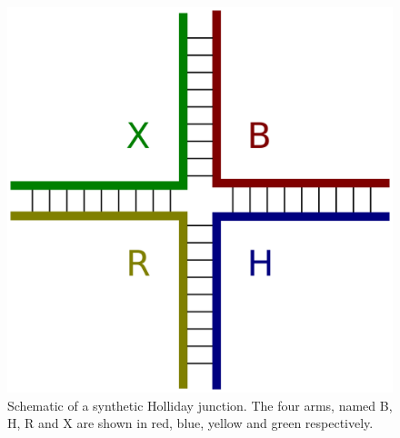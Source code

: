 \begin{figure}
   \begin{center}
      \includegraphics*[clip=true, width=6in]{sizing/holliday_junction.pdf}
      \caption{Schematic of a synthetic Holliday junction. The four arms, named B, H, R and X are shown in red, blue, yellow and green respectively.}
      \label{fig:holliday_junction}
   \end{center}
\end{figure}

